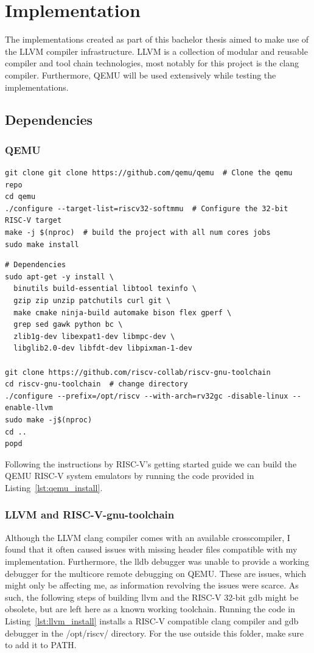 \section{Implementation}
The implementations created as part of this bachelor thesis aimed to make use of
the LLVM compiler infrastructure. LLVM is a collection of modular and reusable
compiler and tool chain technologies, most notably for this project is the clang
compiler. Furthermore, QEMU will be used extensively while testing the
implementations.

\subsection{Dependencies}
\subsubsection*{QEMU}
\begin{lstlisting}[caption=Installing QEMU, label=lst:qemu_install, float]
git clone git clone https://github.com/qemu/qemu  # Clone the qemu repo
cd qemu
./configure --target-list=riscv32-softmmu  # Configure the 32-bit RISC-V target
make -j $(nproc)  # build the project with all num cores jobs
sudo make install
\end{lstlisting}
\begin{lstlisting}[caption=Installing LLVM compiler infastructure with RISC-V
32-bit as native target., label=lst:llvm_install, float]
# Dependencies
sudo apt-get -y install \
  binutils build-essential libtool texinfo \
  gzip zip unzip patchutils curl git \
  make cmake ninja-build automake bison flex gperf \
  grep sed gawk python bc \
  zlib1g-dev libexpat1-dev libmpc-dev \
  libglib2.0-dev libfdt-dev libpixman-1-dev

git clone https://github.com/riscv-collab/riscv-gnu-toolchain
cd riscv-gnu-toolchain  # change directory
./configure --prefix=/opt/riscv --with-arch=rv32gc -disable-linux --enable-llvm
sudo make -j$(nproc)
cd ..
popd
\end{lstlisting}
Following the instructions by RISC-V's getting started guide
we can build the QEMU RISC-V system emulators by running the code
provided in Listing~\ref{lst:qemu_install}\cite{RISC-V_GS}.

\subsubsection*{LLVM and RISC-V-gnu-toolchain}
Although the LLVM clang compiler comes with an available crosscompiler, I found
that it often caused issues with missing header files compatible with my
implementation. Furthermore, the lldb debugger was unable to provide a working
debugger for the multicore remote debugging on QEMU. These are issues, which
might only be affecting me, as information revolving the issues were scarce. As
such, the following steps of building llvm and the RISC-V 32-bit gdb might be
obsolete, but are left here as a known working toolchain. Running the code in
Listing~\ref{lst:llvm_install} installs a RISC-V compatible clang compiler and
gdb debugger in the /opt/riscv/ directory. For the use outside this folder, make
sure to add it to PATH.

